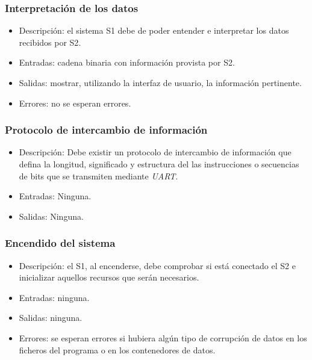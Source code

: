 \subsubsection{Interpretación de los datos}
\begin{itemize}
    \item Descripción: el sistema \ac{S1} debe de poder entender e interpretar los datos recibidos por \ac{S2}.
    \item Entradas: cadena binaria con información provista por \ac{S2}.
    \item Salidas: mostrar, utilizando la interfaz de usuario, la información pertinente.
    \item Errores: no se esperan errores.
\end{itemize}

\subsubsection{Protocolo de intercambio de información}
\begin{itemize}
    \item Descripción: Debe existir un protocolo de intercambio de información que defina la longitud, significado y estructura del las instrucciones o secuencias de bits que se transmiten mediante \textit{UART}.
    \item Entradas: Ninguna.
    \item Salidas: Ninguna.
\end{itemize}    

\subsubsection{Encendido del sistema}
\begin{itemize}
    \item Descripción: el \ac{S1}, al encenderse, debe comprobar si está conectado el \ac{S2} e inicializar aquellos recursos que serán necesarios.
    \item Entradas: ninguna.
    \item Salidas: ninguna.
    \item Errores: se esperan errores si hubiera algún tipo de corrupción de datos en los ficheros del programa o en los contenedores de datos.
\end{itemize}

